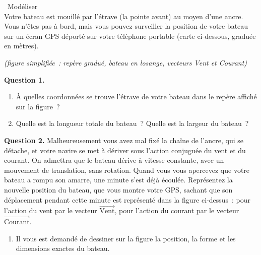 \documentclass[11pt,a4paper]{article}
\newcommand{\starfull}[1]{{\color{#1}\ding{72}}}
\newcommand{\starempty}{{\color{gray!45}\ding{73}}}
\begin{document}
\begin{tcolorbox}[boxrule=0.8pt,colframe=black,colback=white,arc=2pt,left=6pt,right=6pt,top=5pt,bottom=5pt]
\ \starempty\starfull{diffblue}\starempty\hfill{\color{gray!40!black}Mod\'eliser}\\
Votre bateau est mouill\'e par l'\'etrave (la pointe avant) au moyen d'une ancre. Vous n'\^etes pas \`a bord, mais vous pouvez surveiller la position de votre bateau sur un \'ecran GPS d\'eport\'e sur votre t\'el\'ephone portable (carte ci-dessous, gradu\'ee en m\`etres).
\begin{center}
{\small\itshape (figure simplifi\'ee~: rep\`ere gradu\'e, bateau en losange, vecteurs Vent et Courant)}\\[4pt]
\end{center}
\textbf{Question 1.}
\begin{enumerate}
\item[a.] \`A quelles coordonn\'ees se trouve l'\'etrave de votre bateau dans le rep\`ere affich\'e sur la figure~?
\item[b.] Quelle est la longueur totale du bateau~? Quelle est la largeur du bateau~?
\end{enumerate}
\textbf{Question 2.} Malheureusement vous avez mal fix\'e la cha\^ine de l'ancre, qui se d\'etache, et votre navire se met \`a d\'eriver sous l'action conjugu\'ee du vent et du courant. On admettra que le bateau d\'erive \`a vitesse constante, avec un mouvement de translation, sans rotation. Quand vous vous apercevez que votre bateau a rompu son amarre, une minute s'est d\'ej\`a \'ecoul\'ee. Repr\'esentez la nouvelle position du bateau, que vous montre votre GPS, sachant que son d\'eplacement pendant cette minute est repr\'esent\'e dans la figure ci-dessus~: pour l'action du vent par le vecteur $\overrightarrow{\text{Vent}}$, pour l'action du courant par le vecteur $\overrightarrow{\text{Courant}}$.
\begin{enumerate}
\item[a.] Il vous est demand\'e de dessiner sur la figure la position, la forme et les dimensions exactes du bateau.

\end{enumerate}
\end{tcolorbox}
\end{document}
